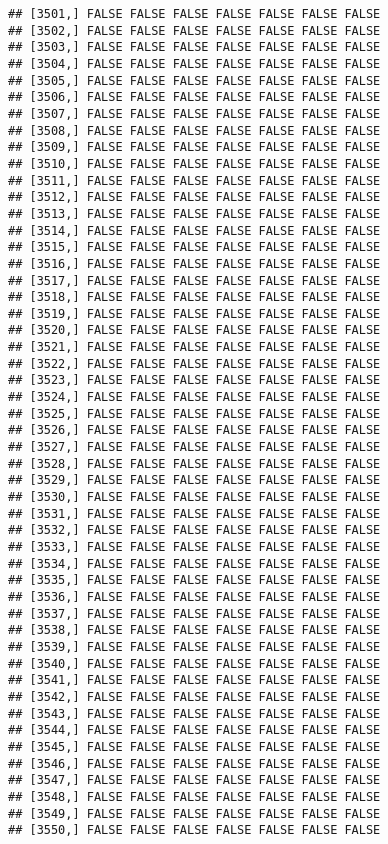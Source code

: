 \documentclass[
]{article}
\begin{document}
\begin{verbatim}
## [3501,] FALSE FALSE FALSE FALSE FALSE FALSE FALSE
## [3502,] FALSE FALSE FALSE FALSE FALSE FALSE FALSE
## [3503,] FALSE FALSE FALSE FALSE FALSE FALSE FALSE
## [3504,] FALSE FALSE FALSE FALSE FALSE FALSE FALSE
## [3505,] FALSE FALSE FALSE FALSE FALSE FALSE FALSE
## [3506,] FALSE FALSE FALSE FALSE FALSE FALSE FALSE
## [3507,] FALSE FALSE FALSE FALSE FALSE FALSE FALSE
## [3508,] FALSE FALSE FALSE FALSE FALSE FALSE FALSE
## [3509,] FALSE FALSE FALSE FALSE FALSE FALSE FALSE
## [3510,] FALSE FALSE FALSE FALSE FALSE FALSE FALSE
## [3511,] FALSE FALSE FALSE FALSE FALSE FALSE FALSE
## [3512,] FALSE FALSE FALSE FALSE FALSE FALSE FALSE
## [3513,] FALSE FALSE FALSE FALSE FALSE FALSE FALSE
## [3514,] FALSE FALSE FALSE FALSE FALSE FALSE FALSE
## [3515,] FALSE FALSE FALSE FALSE FALSE FALSE FALSE
## [3516,] FALSE FALSE FALSE FALSE FALSE FALSE FALSE
## [3517,] FALSE FALSE FALSE FALSE FALSE FALSE FALSE
## [3518,] FALSE FALSE FALSE FALSE FALSE FALSE FALSE
## [3519,] FALSE FALSE FALSE FALSE FALSE FALSE FALSE
## [3520,] FALSE FALSE FALSE FALSE FALSE FALSE FALSE
## [3521,] FALSE FALSE FALSE FALSE FALSE FALSE FALSE
## [3522,] FALSE FALSE FALSE FALSE FALSE FALSE FALSE
## [3523,] FALSE FALSE FALSE FALSE FALSE FALSE FALSE
## [3524,] FALSE FALSE FALSE FALSE FALSE FALSE FALSE
## [3525,] FALSE FALSE FALSE FALSE FALSE FALSE FALSE
## [3526,] FALSE FALSE FALSE FALSE FALSE FALSE FALSE
## [3527,] FALSE FALSE FALSE FALSE FALSE FALSE FALSE
## [3528,] FALSE FALSE FALSE FALSE FALSE FALSE FALSE
## [3529,] FALSE FALSE FALSE FALSE FALSE FALSE FALSE
## [3530,] FALSE FALSE FALSE FALSE FALSE FALSE FALSE
## [3531,] FALSE FALSE FALSE FALSE FALSE FALSE FALSE
## [3532,] FALSE FALSE FALSE FALSE FALSE FALSE FALSE
## [3533,] FALSE FALSE FALSE FALSE FALSE FALSE FALSE
## [3534,] FALSE FALSE FALSE FALSE FALSE FALSE FALSE
## [3535,] FALSE FALSE FALSE FALSE FALSE FALSE FALSE
## [3536,] FALSE FALSE FALSE FALSE FALSE FALSE FALSE
## [3537,] FALSE FALSE FALSE FALSE FALSE FALSE FALSE
## [3538,] FALSE FALSE FALSE FALSE FALSE FALSE FALSE
## [3539,] FALSE FALSE FALSE FALSE FALSE FALSE FALSE
## [3540,] FALSE FALSE FALSE FALSE FALSE FALSE FALSE
## [3541,] FALSE FALSE FALSE FALSE FALSE FALSE FALSE
## [3542,] FALSE FALSE FALSE FALSE FALSE FALSE FALSE
## [3543,] FALSE FALSE FALSE FALSE FALSE FALSE FALSE
## [3544,] FALSE FALSE FALSE FALSE FALSE FALSE FALSE
## [3545,] FALSE FALSE FALSE FALSE FALSE FALSE FALSE
## [3546,] FALSE FALSE FALSE FALSE FALSE FALSE FALSE
## [3547,] FALSE FALSE FALSE FALSE FALSE FALSE FALSE
## [3548,] FALSE FALSE FALSE FALSE FALSE FALSE FALSE
## [3549,] FALSE FALSE FALSE FALSE FALSE FALSE FALSE
## [3550,] FALSE FALSE FALSE FALSE FALSE FALSE FALSE

\end{verbatim}
\end{document}
